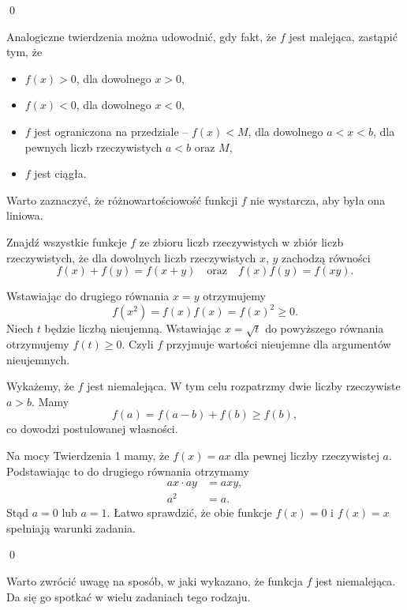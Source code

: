 \qed

\newpage
\noindent
Analogiczne twierdzenia można udowodnić, gdy fakt, że $f$ jest malejąca, zastąpić tym, że 
\begin{itemize}
	\item $f(x) > 0$, dla dowolnego $x > 0$,
	\item $f(x) < 0$, dla dowolnego $x < 0$,
	\item $f$ jest ograniczona na przedziale -- $f(x) < M$, dla dowolnego $a < x < b$, dla pewnych liczb rzeczywistych $a < b$ oraz $M$,
	\item $f$ jest ciągła.
\end{itemize}
Warto zaznaczyć, że różnowartościowość funkcji $f$ nie wystarcza, aby była ona liniowa. 


\vspace{10px}


\noindent
Znajdź wszystkie funkcje $f$ ze zbioru liczb rzeczywistych w zbiór liczb rzeczywistych, że dla dowolnych liczb rzeczywistych $x$, $y$ zachodzą równości
\[ 
	f(x) + f(y) = f(x + y) \quad \text{oraz} \quad f(x)f(y) = f(xy).
\]

\vspace{5px}


\noindent
Wstawiając do drugiego równania $x = y$ otrzymujemy
\[
	f(x^2) = f(x)f(x) = f(x)^2 \geqslant 0.
\]
Niech $t$ będzie liczbą nieujemną. Wstawiając $x = \sqrt{t}$ do powyższego równania otrzymujemy $f(t) \geqslant 0$. Czyli $f$ przyjmuje wartości nieujemne dla argumentów nieujemnych.

\vspace{10px}
\noindent
Wykażemy, że $f$ jest niemalejąca. W tym celu rozpatrzmy dwie liczby rzeczywiste $a > b$. Mamy
\[
	f(a) = f(a - b) + f(b) \geqslant f(b),
\]
co dowodzi postulowanej własności.

\vspace{10px}
\noindent
Na mocy Twierdzenia 1 mamy, że $f(x) = ax$ dla pewnej liczby rzeczywistej $a$. Podstawiając to do drugiego równania otrzymamy
\begin{align*}
	ax \cdot ay &= axy, \\
	a^2 &= a.
\end{align*}
Stąd $a = 0$ lub $a = 1$. Łatwo sprawdzić, że obie funkcje $f(x) = 0$ i $f(x) = x$ spełniają warunki zadania.

\qed

\vspace{10px}
\noindent 
Warto zwrócić uwagę na sposób, w jaki wykazano, że funkcja $f$ jest niemalejąca. Da się go spotkać w wielu zadaniach tego rodzaju. 

